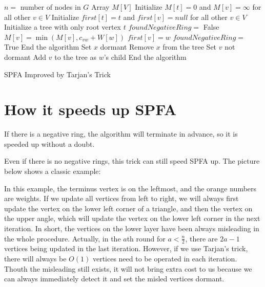 \documentclass{article}
\begin{document}
\begin{algorithm}
    $n=$ number of nodes in $G$\;
    Array $M[V]$\;
    Initialize $M[t]=0$ and $M[v]=\infty$ for all other $v\in V$\;
    Initialize $first[t]=t$ and $first[v]=null$ for all other $v\in V$\;
    Initialize a tree with only root vertex $t$\;
    $foundNegativeRing=$ False\;
     {
         {
             {
                 {
                    $M[v]=\min(M[v],c_{vw}+W[w])$\;
                     {
                        $first[v]=w$\;
                         {
                             {
                                $foundNegativeRing=$ True\;
                                End the algorithm\;
                            }
                            Set $x$ dormant\;
                            Remove $x$ from the tree\;
                        }
                        Set $v$ not dormant\;
                        Add $v$ to the tree as $w$'s child\;
                    }
                }
            }
        }
         {
            End the algorithm\;
        }
    }
    \caption{SPFA Improved by Tarjan's Trick}
\end{algorithm}

\section{How it speeds up SPFA}

If there is a negative ring, the algorithm will terminate in advance, so it is speeded up without a doubt.

Even if there is no negative rings, this trick can still speed SPFA up. The picture below shows a classic example: 

In this example, the terminus vertex is on the leftmost, and the orange numbers are weights. If we update all vertices from left to right, we will always first update the vertex on the lower left corner of a triangle, and then the vertex on the upper angle, which will update the vertex on the lower left corner in the next iteration. In short, the vertices on the lower layer have been always misleading in the whole procedure. Actually, in the $a$th round for $a<\frac{n}{2}$, there are $2a-1$ vertices being updated in the last iteration. However, if we use Tarjan's trick, there will always be $O(1)$ vertices need to be operated in each iteration. Thouth the misleading still exists, it will not bring extra cost to us because we can always immediately detect it and set the misled vertices dormant.
\end{document}
